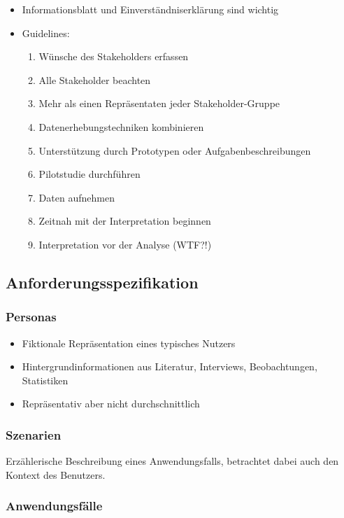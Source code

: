 \begin{itemize}
\item
  Informationsblatt und Einverständniserklärung sind wichtig
\item
  Guidelines:

  \begin{enumerate}[1.]
  \item
    Wünsche des Stakeholders erfassen
  \item
    Alle Stakeholder beachten
  \item
    Mehr als einen Repräsentaten jeder Stakeholder-Gruppe
  \item
    Datenerhebungstechniken kombinieren
  \item
    Unterstützung durch Prototypen oder Aufgabenbeschreibungen
  \item
    Pilotstudie durchführen
  \item
    Daten aufnehmen
  \item
    Zeitnah mit der Interpretation beginnen
  \item
    Interpretation vor der Analyse (WTF?!)
  \end{enumerate}
\end{itemize}

\subsection{Anforderungsspezifikation}

\subsubsection{Personas}

\begin{itemize}
\item
  Fiktionale Repräsentation eines typisches Nutzers
\item
  Hintergrundinformationen aus Literatur, Interviews, Beobachtungen,
  Statistiken
\item
  Repräsentativ aber nicht durchschnittlich
\end{itemize}

\subsubsection{Szenarien}

Erzählerische Beschreibung eines Anwendungsfalls, betrachtet dabei auch
den Kontext des Benutzers.

\subsubsection{Anwendungsfälle}

